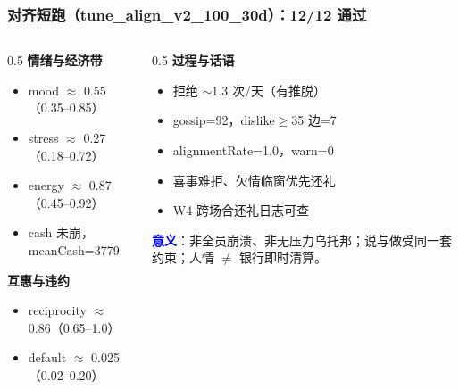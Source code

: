\documentclass[AutoFakeBold,AutoFakeSlant]{beamer}
\begin{document}
\begin{frame}
    \frametitle{对齐短跑（tune\_align\_v2\_100\_30d）：12/12 通过}
    \scriptsize
    \begin{columns}
        \begin{column}{0.5\textwidth}
            \textbf{情绪与经济带}
            \begin{itemize}
                \item mood $\approx$ 0.55（0.35--0.85）
                \item stress $\approx$ 0.27（0.18--0.72）
                \item energy $\approx$ 0.87（0.45--0.92）
                \item cash 未崩，meanCash=3779
            \end{itemize}
            \textbf{互惠与违约}
            \begin{itemize}
                \item reciprocity $\approx$ 0.86（0.65--1.0）
                \item default $\approx$ 0.025（0.02--0.20）
            \end{itemize}
        \end{column}
        \begin{column}{0.5\textwidth}
            \textbf{过程与话语}
            \begin{itemize}
                \item 拒绝 $\sim$1.3 次/天（有推脱）
                \item gossip=92，dislike$\geq$35 边=7
                \item alignmentRate=1.0，warn=0
                \item 喜事难拒、欠情临窗优先还礼
                \item W4 跨场合还礼日志可查
            \end{itemize}
            \vspace{0.3em}
            \textcolor{blue}{\textbf{意义}}：非全员崩溃、非无压力乌托邦；说与做受同一套约束；人情 $\neq$ 银行即时清算。
        \end{column}
    \end{columns}
\end{frame}
\end{document}
